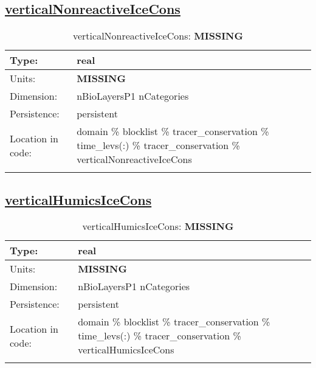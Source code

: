 \subsection[verticalNonreactiveIceCons]{\hyperref[sec:var_tab_tracer_conservation]{verticalNonreactiveIceCons}}
\label{subsec:var_sec_tracer_conservation_verticalNonreactiveIceCons}
\begin{center}
\begin{longtable}{| p{2.0in} | p{4.0in} |}
        \hline 
        Type: & real \\
        \hline 
        Units: & {\bf \color{red} MISSING} \\
        \hline 
        Dimension: & nBioLayersP1 nCategories \\
        \hline 
        Persistence: & persistent \\
        \hline 
         Location in code: & domain \% blocklist \% tracer\_conservation \% time\_levs(:) \% tracer\_conservation \% verticalNonreactiveIceCons \\
         \hline 
    \caption{verticalNonreactiveIceCons: {\bf \color{red} MISSING}}
\end{longtable}
\end{center}
\subsection[verticalHumicsIceCons]{\hyperref[sec:var_tab_tracer_conservation]{verticalHumicsIceCons}}
\label{subsec:var_sec_tracer_conservation_verticalHumicsIceCons}
\begin{center}
\begin{longtable}{| p{2.0in} | p{4.0in} |}
        \hline 
        Type: & real \\
        \hline 
        Units: & {\bf \color{red} MISSING} \\
        \hline 
        Dimension: & nBioLayersP1 nCategories \\
        \hline 
        Persistence: & persistent \\
        \hline 
         Location in code: & domain \% blocklist \% tracer\_conservation \% time\_levs(:) \% tracer\_conservation \% verticalHumicsIceCons \\
         \hline 
    \caption{verticalHumicsIceCons: {\bf \color{red} MISSING}}
\end{longtable}
\end{center}
